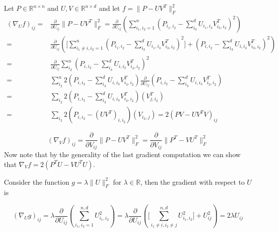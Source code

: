 \documentclass{report}
\begin{document}
   
   \newpage
   Let $ P \in \mathbb{R}^{n \times n} $ and $ U, V \in \mathbb{R}^{n \times d} $ and let $ f = \|P - UV^T\|_F^2 $
   \begin{align*}
     (\nabla_U f)_{ij} =& \frac{\partial}{\partial U_{ij}}\|P - UV^T\|_F^2 = 
     \frac{\partial}{\partial U_{ij}} (\displaystyle \sum_{i_1,i_2 =1}^n(P_{i_1,i_2} 
                     - \displaystyle\sum_{i_3}^d U_{i_1,i_3}V^T_{i_3,i_2})^2)  \\
       =& \frac{\partial}{\partial U_{ij}} (\lbrack \displaystyle \sum_{i_1 \neq i,i_2 =1}^n(P_{i_1,i_2} 
       - \displaystyle\sum_{i_3}^d U_{i_1,i_3}V^T_{i_3,i_2})^2 \rbrack + (P_{i,i_2} 
       - \displaystyle\sum_{i_3}^d U_{i,i_3}V^T_{i_3,i_2})^2)\\
       =& \frac{\partial}{\partial U_{ij}}\displaystyle\sum_{i_2}^n(P_{i,i_2} 
       - \displaystyle\sum_{i_3}^d U_{i,i_3}V^T_{i_3,i_2})^2 \\
       =& \displaystyle\sum_{i_2}^n2(P_{i,i_2} 
       - \displaystyle\sum_{i_3}^d U_{i,i_3}V^T_{i_3,i_2})\frac{\partial}{\partial U_{ij}}(P_{i,i_2} 
       - \displaystyle\sum_{i_3}^d U_{i,i_3}V^T_{i_3,i_2}) \\
       =& \displaystyle\sum_{i_2} 2(P_{i,i_2} 
       - \displaystyle\sum_{i_3}^d U_{i,i_3}V^T_{i_3,i_2})(V^T_{j,i_2}) \\
       =& \displaystyle\sum_{i_2} 2(P_{i,i_2} 
       - (UV^T)_{i,i_2})(V_{i_2,j}) = 2(PV - UV^TV)_{ij}
   \end{align*}
 
  \[
    (\nabla_Vf)_{ij} 
    = \frac{\partial}{\partial V_{ij}}\|P - UV^T\|^2_F = \frac{\partial}{\partial V_{ij}}\|P^T - VU^T\|^2_F
  \]
   	Now note that by the generality of the last gradient computation we can show that $ \nabla_Vf = 2(P^TU - VU^TU) $.
   	
   	Consider the function $ g = \lambda\|U\|_F^2 $ for $ \lambda \in \mathbb{R} $, then the gradient with respect to $ U $ is 
   	
   	\[ 
   	 (\nabla_{U}g)_{ij} 
   	   = \lambda
   	     \frac{\partial}{\partial U_{ij}}(\sum_{i_1,i_2 = 1}^{n,d}U^2_{i_1,i_2})
   	   = \lambda \frac{\partial}{\partial U_{ij}}
   	     (\lbrack \sum_{i_1 \neq i,i_2 \neq j}^{n,d}U^2_{i_1,i_2}\rbrack + U_{ij}^2) = 2\lambda U_{ij}
   	\]
   	
\end{document}
